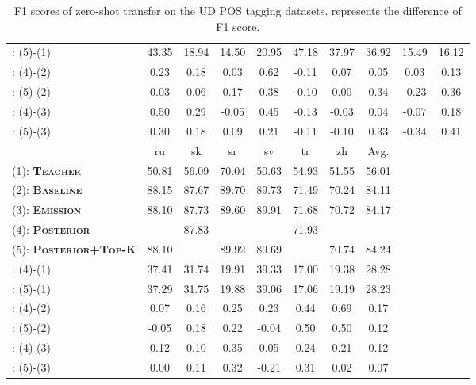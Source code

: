 \documentclass[11pt,a4paper]{article}
\begin{document}
\begin{table*}[t]
\begin{tabular}{l|ccccccccc}
: (5)-(1) & 43.35 & 18.94 & 14.50 & 20.95 & 47.18 & 37.97 & 36.92 & 15.49 & 16.12 \\
: (4)-(2) & 0.23 & 0.18 & 0.03 & 0.62 & -0.11 & 0.07 & 0.05 & 0.03 & 0.13 \\
: (5)-(2) & 0.03 & 0.06 & 0.17 & 0.38 & -0.10 & 0.00 & 0.34 & -0.23 & 0.36 \\
: (4)-(3) & 0.50 & 0.29 & -0.05 & 0.45 & -0.13 & -0.03 & 0.04 & -0.07 & 0.18 \\
: (5)-(3) & 0.30 & 0.18 & 0.09 & 0.21 & -0.11 & -0.10 & 0.33 & -0.34 & 0.41 \\
 \hline\hline
 & ru & sk & sr & sv & tr & zh & Avg. &  &  \\
 \hline
(1): {\bf\textsc{Teacher}}  & 50.81 & 56.09 & 70.04 & 50.63 & 54.93 & 51.55 & 56.01 &  &  \\
(2): {\bf\textsc{Baseline}}  & 88.15 & 87.67 & 89.70 & 89.73 & 71.49 & 70.24 & 84.11 &  &  \\
(3): {\bf\textsc{Emission}}  & 88.10 & 87.73 & 89.60 & 89.91 & 71.68 & 70.72 & 84.17 &  &  \\
(4): {\bf\textsc{Posterior}}  &  & 87.83 &  &  & 71.93 &  &  &  &  \\
(5): {\bf\textsc{Posterior+Top-K}}  & 88.10 &  & 89.92 & 89.69 &  & 70.74 & 84.24 &  &  \\
\hline
: (4)-(1) & 37.41 & 31.74 & 19.91 & 39.33 & 17.00 & 19.38 & 28.28 &  &  \\
: (5)-(1) & 37.29 & 31.75 & 19.88 & 39.06 & 17.06 & 19.19 & 28.23 &  &  \\
: (4)-(2) & 0.07 & 0.16 & 0.25 & 0.23 & 0.44 & 0.69 & 0.17 &  &  \\
: (5)-(2) & -0.05 & 0.18 & 0.22 & -0.04 & 0.50 & 0.50 & 0.12 &  &  \\
: (4)-(3) & 0.12 & 0.10 & 0.35 & 0.05 & 0.24 & 0.21 & 0.12 &  &  \\
: (5)-(3) & 0.00 & 0.11 & 0.32 & -0.21 & 0.31 & 0.02 & 0.07 &  & \\
\hline\hline
\end{tabular}
\caption{F1 scores of zero-shot transfer on the UD POS tagging datasets.  represents the difference of F1 score.}
\label{tab:zs_pos}
\end{table*}
\end{document}
